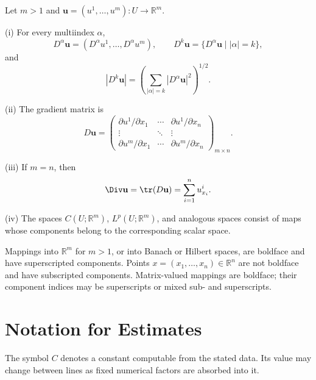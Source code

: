 \begin{definition}
\label{def:vector-valued-function-notation}
Let $m>1$ and $\mathbf u=(u^1,\ldots,u^m):U\to\mathbb R^m$.

(i) For every multiindex $\alpha$,
\[
D^\alpha\mathbf u=(D^\alpha u^1,\ldots,D^\alpha u^m),
\qquad
D^k\mathbf u=\{D^\alpha\mathbf u\mid |\alpha|=k\},
\]
and
\[
|D^k\mathbf u|
=\left(\sum_{|\alpha|=k}|D^\alpha\mathbf u|^2\right)^{1/2}.
\]

(ii) The gradient matrix is
\[
D\mathbf u=
\begin{pmatrix}
\partial u^1/\partial x_1&\cdots&\partial u^1/\partial x_n\\
\vdots&\ddots&\vdots\\
\partial u^m/\partial x_1&\cdots&\partial u^m/\partial x_n
\end{pmatrix}_{m\times n}.
\]

(iii) If $m=n$, then
\[
\Div\mathbf u
=\tr(D\mathbf u)
=\sum_{i=1}^n u^i_{x_i}.
\]

(iv) The spaces $C(U;\mathbb R^m)$, $L^p(U;\mathbb R^m)$, and analogous spaces consist of maps whose components belong to the corresponding scalar space.
\end{definition}

\begin{remark}
\label{rem:boldface-convention-sub-superscripts}
Mappings into $\mathbb R^m$ for $m>1$, or into Banach or Hilbert spaces, are boldface and have superscripted components. Points $x=(x_1,\ldots,x_n)\in\mathbb R^n$ are not boldface and have subscripted components. Matrix-valued mappings are boldface; their component indices may be superscripts or mixed sub- and superscripts.
\end{remark}

\section{Notation for Estimates}
\label{sec:notation-for-estimates}

\begin{remark}[Constants]
\label{rem:constant-notation-convention}
The symbol $C$ denotes a constant computable from the stated data. Its value may change between lines as fixed numerical factors are absorbed into it.
\end{remark}

